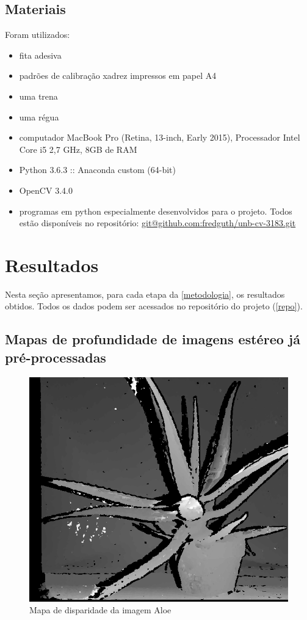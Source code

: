 \documentclass[conference]{IEEEtran}
\begin{document}
\subsection{Materiais}
Foram utilizados:
\begin{itemize}

\item fita adesiva
\item padrões de calibração xadrez impressos em papel A4
\item uma trena
\item uma régua
\item computador MacBook Pro (Retina, 13-inch, Early 2015), Processador Intel Core i5 2,7 GHz, 8GB de RAM
\item Python 3.6.3 :: Anaconda custom (64-bit)
\item OpenCV 3.4.0
\item programas em python especialmente desenvolvidos para o projeto. Todos estão disponíveis no repositório: \url{git@github.com:fredguth/unb-cv-3183.git}\label{repo}
\end{itemize}



\section{Resultados}
Nesta seção apresentamos, para cada etapa da \ref{metodologia}, os resultados obtidos. Todos os dados podem ser acessados no repositório do projeto (\ref{repo}).

\subsection{Mapas de profundidade de imagens estéreo já pré-processadas}


\begin{figure}[ht!]\label{aloeDisp}
\begin{center}
\includegraphics[width= .85\columnwidth]{aloeDisp.png}
\caption{Mapa de disparidade da imagem Aloe}
\end{center}
\end{figure}
\end{document}
